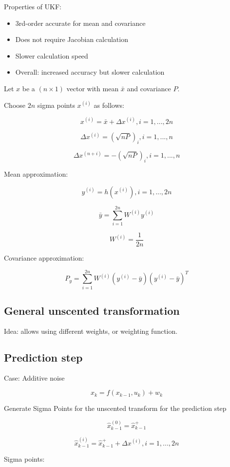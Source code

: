 \documentclass[11pt]{article}
\begin{document}
Properties of UKF: 
\begin{itemize}
    \item 3rd-order accurate for mean and covariance 
    \item Does not require Jacobian calculation 
    \item Slower calculation speed 
    \item Overall: increased accuracy but slower calculation 
\end{itemize}


Let $x$ be a $(n \times 1)$ vector with mean $\bar{x}$ and covariance $P$.

Choose $2n$ sigma points $x^{(i)}$ as follows:

\[ x^{(i)} = \bar{x} + \Delta x^{(i)}, i = 1, ..., 2n \] 

\[ \Delta x^{(i)} = (\sqrt{nP})_i, i = 1, ..., n \]

\[ \Delta x^{(n+i)} = -(\sqrt{nP})_i, i = 1, ..., n \]

Mean approximation:

\[ y^{(i)} = h(x^{(i)}), i = 1, ..., 2n \]

\[ \bar{y} = \sum_{i=1}^{2n} W^{(i)} y^{(i)} \]

\[W^{(i)} = \frac{1}{2n} \]

Covariance approximation:

\[ P_y = \sum_{i=1}^{2n} W^{(i)} (y^{(i)} - \bar{y}) (y^{(i)} - \bar{y})^T \]

\subsection*{General unscented transformation}

Idea: allows using different weights, or weighting function.


\subsection{Prediction step}

Case: Additive noise

\[ x_k = f(x_{k-1}, u_k) + w_k \]

Generate Sigma Points for the unscented transform for the prediction step

\[ \hat{x}^{(0)}_{k-1} = \hat{x}^+_{k-1} \]

\[ \hat{x}^{(i)}_{k-1} = \hat{x}^+_{k-1} + \Delta x^{(i)}, i = 1, ..., 2n \]


Sigma points:
\end{document}
